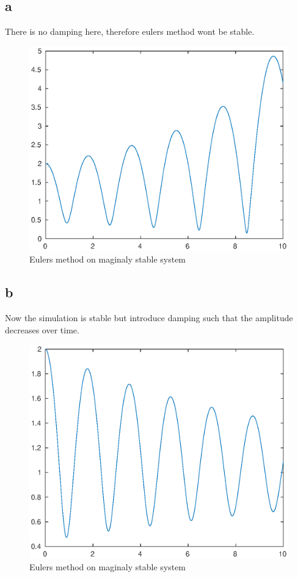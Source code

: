\documentclass[11pt]{article}
\begin{document}
\subsection*{a}
There is no damping here, therefore eulers method wont be stable.
\begin{figure}[H]
\centering
\includegraphics[width=.8\textwidth]{2a.eps}
\caption{Eulers method on maginaly stable system}
\end{figure}

\subsection*{b}
Now the simulation is stable but introduce damping such that the amplitude decreases over time.
\begin{figure}[H]
\centering
\includegraphics[width=.8\textwidth]{2b.eps}
\caption{Eulers method on maginaly stable system}
\end{figure}
\end{document}
